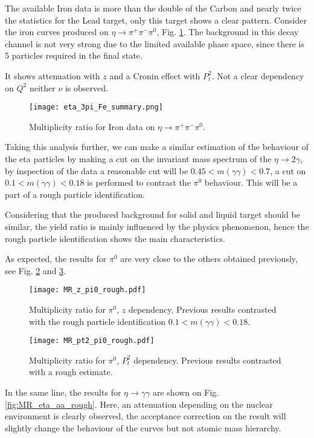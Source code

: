 The available Iron data is more than the double of the Carbon and nearly twice the statistics for the Lead target, only this target shows a clear pattern. Consider the iron curves produced on $\eta \rightarrow \pi^+\pi^-\pi^0$, Fig. \ref{fig:eta_3pi_Fe}. The background in this decay channel is not very strong due to the limited available phase space, since there is 5 particles required in the final state.

It shows attenuation with $z$ and a Cronin effect with $P_t^2$. Not a clear dependency on $Q^2$ neither $\nu$ is observed.
%
%
\begin{figure}[H]
\centering
\texttt{[image: eta\_3pi\_Fe\_summary.png]}
\caption{Multiplicity ratio for Iron data on $\eta \rightarrow \pi^+\pi^-\pi^0$.}
\label{fig:eta_3pi_Fe}
\end{figure}
%
Taking this analysis further, we can make a similar estimation of the behaviour of the eta particles by making a cut on the invariant mass spectrum of the $\eta \rightarrow 2\gamma$, by inspection of the data a reasonable cut will be $0.45<m(\gamma\gamma)<0.7$, a cut on  $0.1<m(\gamma\gamma)<0.18$ is performed to contrast the $\pi^0$ behaviour. This will be a part of a rough particle identification.

Considering that the produced background for solid and liquid target should be similar, the yield ratio is mainly influenced by the physics phenomenon, hence the rough particle identification shows the main characteristics.

As expected, the results for $\pi^0$ are very close to the others obtained previously, see Fig. \ref{fig:MR_pi0_z_rough} and \ref{fig:MR_pi0_pt2_rough}.

\begin{figure}[H]
\centering
\texttt{[image: MR\_z\_pi0\_rough.pdf]}
\caption{Multiplicity ratio for $\pi^0$, $z$ dependency. Previous results contrasted with the  rough particle identification $0.1<m(\gamma\gamma)<0.18$.}
\label{fig:MR_pi0_z_rough}
\end{figure}

\begin{figure}[H]
\centering
\texttt{[image: MR\_pt2\_pi0\_rough.pdf]}
\caption{Multiplicity ratio for $\pi^0$, $P_t^2$ dependency. Previous results contrasted with a rough estimate.}
\label{fig:MR_pi0_pt2_rough}
\end{figure}

In the same line, the results for $\eta \rightarrow \gamma\gamma$ are shown on Fig. \ref{fig:MR_eta_aa_rough}. Here, an attenuation depending on the nuclear environment is clearly observed, the acceptance correction on the result will slightly change the behaviour of the curves but not atomic mass hierarchy.

